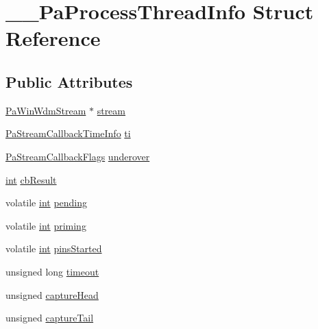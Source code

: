 \hypertarget{struct_____pa_process_thread_info}{}\section{\+\_\+\+\_\+\+Pa\+Process\+Thread\+Info Struct Reference}
\label{struct_____pa_process_thread_info}
\subsection*{Public Attributes}
\begin{DoxyCompactItemize}
\item 
\hyperlink{pa__win__wdmks_8c_a41c57e03e58e2456ec901b8337ce6791}{Pa\+Win\+Wdm\+Stream} $\ast$ \hyperlink{struct_____pa_process_thread_info_a2864554c215847b4fa60f99bbed68323}{stream}
\item 
\hyperlink{struct_pa_stream_callback_time_info}{Pa\+Stream\+Callback\+Time\+Info} \hyperlink{struct_____pa_process_thread_info_a136fb47bcce3eba9d06797ac97109f17}{ti}
\item 
\hyperlink{portaudio_8h_a55a005924bcfa0424594f4f65cd4ae82}{Pa\+Stream\+Callback\+Flags} \hyperlink{struct_____pa_process_thread_info_adaf9f419fc2faac367df5ce8807064a1}{underover}
\item 
\hyperlink{xmltok_8h_a5a0d4a5641ce434f1d23533f2b2e6653}{int} \hyperlink{struct_____pa_process_thread_info_aff68ee41ea10c48f0a7a59b1b914fb6b}{cb\+Result}
\item 
volatile \hyperlink{xmltok_8h_a5a0d4a5641ce434f1d23533f2b2e6653}{int} \hyperlink{struct_____pa_process_thread_info_aa45f4971b33af9b928d1b158e0e508a2}{pending}
\item 
volatile \hyperlink{xmltok_8h_a5a0d4a5641ce434f1d23533f2b2e6653}{int} \hyperlink{struct_____pa_process_thread_info_abd6f079f77dad8c8489c060f8d68fedb}{priming}
\item 
volatile \hyperlink{xmltok_8h_a5a0d4a5641ce434f1d23533f2b2e6653}{int} \hyperlink{struct_____pa_process_thread_info_ad138de1cdf8c7e4890fb41329daf4477}{pins\+Started}
\item 
unsigned long \hyperlink{struct_____pa_process_thread_info_ae4e34696e69af44278c7633b96f4d683}{timeout}
\item 
unsigned \hyperlink{struct_____pa_process_thread_info_a1f40d5b9b559f02e1a60c3aafb577038}{capture\+Head}
\item 
unsigned \hyperlink{struct_____pa_process_thread_info_a0176c49820b2df61da28580d9702f64f}{capture\+Tail}

\end{DoxyCompactItemize}
